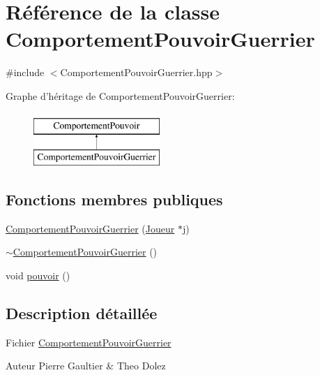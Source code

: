 \hypertarget{class_comportement_pouvoir_guerrier}{\section{Référence de la classe Comportement\-Pouvoir\-Guerrier}
\label{class_comportement_pouvoir_guerrier}
}


{\ttfamily \#include $<$Comportement\-Pouvoir\-Guerrier.\-hpp$>$}

Graphe d'héritage de Comportement\-Pouvoir\-Guerrier\-:\begin{figure}[H]
\begin{center}
\leavevmode
\includegraphics[height=2.000000cm]{class_comportement_pouvoir_guerrier}
\end{center}
\end{figure}
\subsection*{Fonctions membres publiques}
\begin{DoxyCompactItemize}
\item 
\hyperlink{class_comportement_pouvoir_guerrier_a5b4e19698e98c3d7a58a3859c6ca5118}{Comportement\-Pouvoir\-Guerrier} (\hyperlink{class_joueur}{Joueur} $\ast$j)
\item 
\hyperlink{class_comportement_pouvoir_guerrier_ae5113657a16d91283b311f18aa32b1e9}{$\sim$\-Comportement\-Pouvoir\-Guerrier} ()
\item 
void \hyperlink{class_comportement_pouvoir_guerrier_a2747bbff54360379e100aa62254a2a79}{pouvoir} ()
\end{DoxyCompactItemize}


\subsection{Description détaillée}
Fichier \hyperlink{class_comportement_pouvoir_guerrier}{Comportement\-Pouvoir\-Guerrier} \begin{DoxyAuthor}{Auteur}
Pierre Gaultier \& Theo Dolez 
\end{DoxyAuthor}


